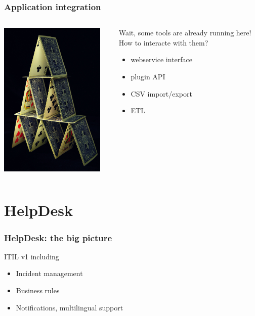 \documentclass{beamer}
\begin{document}
\begin{frame}

    \frametitle{Application integration}
 \begin{columns}
 \begin{column}{0.45\textwidth}
         \includegraphics[height=7.5cm]{./pics/house_of_cards.jpg}
 \end{column}
 \begin{column}{0.45\textwidth}
     \begin{block}{Wait, some tools are already running here! \\
     How to interacte with them?}
        \begin{itemize}
            \item webservice interface
            \item plugin API
            \item CSV import/export
            \item ETL
        \end{itemize}
    \end{block}
   
 \end{column}
\end{columns}






\end{frame}


\section{HelpDesk}

\begin{frame}

    \frametitle{HelpDesk: the big picture}

    \begin{block}{ITIL v1 including}
        \begin{itemize}
            \item Incident management
            \item Business rules
            \item Notifications, multilingual support
        \end{itemize}
    \end{block}


\end{frame}
\end{document}
